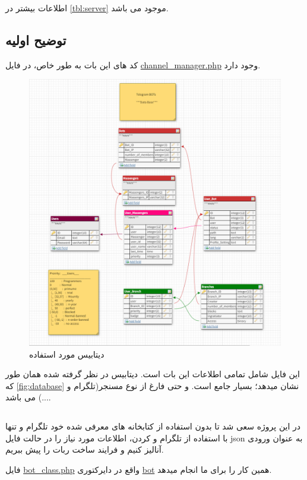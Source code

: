 \documentclass[oneside]{article}
\begin{document}
اطلاعات بیشتر در 
\autoref{tbl:server}
موجود می باشد.

\subsection{توضیح اولیه}
کد های این بات به طور خاص، در فایل 
\href{ftp://telegr28:telegram123456@telegramadminpro.ml/public_html/bot/channel_manager.php}{channel\_manager.php}
وجود دارد.
\begin{figure}
\centering
\includegraphics[width=1\textwidth]{../database.png}
\caption{دیتابیس مورد استفاده}
\label{fig:database}
\end{figure}
این فایل شامل تمامی اطلاعات این بات است. دیتابیس در نظر گرفته شده همان طور که 
\autoref{fig:database}
نشان میدهد؛ بسیار جامع است.
و حتی فارغ از نوع مسنجر(تلگرام و ...) می باشد.
\subsection{}
در این پروژه سعی شد تا بدون استفاده از کتابخانه های معرفی شده خود تلگرام و تنها با استفاده از  تلگرام و  کردن، اطلاعات مورد نیاز را در حالت فایل json به عنوان ورودی آنالیز کنیم و فرایند ساخت ربات را پیش ببریم.

فایل 
\href{ftp://telegr28:telegram123456@telegramadminpro.ml/public_html/bot/bot_class.php}{bot\_class.php}
واقع در دایرکتوری 
\href{ftp://telegr28:telegram123456@telegramadminpro.ml/public_html/bot}{bot}
 همین کار را برای ما انجام میدهد. 
\end{document}
